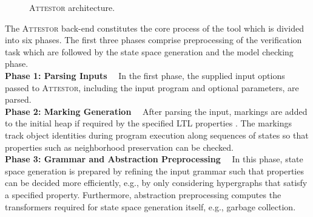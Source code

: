 \documentclass[a4paper, 12pt, twoside]{report}
\begin{document}
\begin{figure}
\begin{center}
{}
			\caption{\textsc{Attestor} architecture. \cite{arndt2018let}}\label{fig:attestor}
		\end{center}
	\end{figure}
	
	The \textsc{Attestor} back-end constitutes the core process of the tool which is divided into six phases. The first three phases comprise preprocessing of the verification task which are followed by the state space generation and the model checking phase.\\
	
	\textbf{Phase 1: Parsing Inputs$\quad$}
	In the first phase, the supplied input options passed to \textsc{Attestor}, including the input program and optional parameters, are parsed.\\
	
	\textbf{Phase 2: Marking Generation$\quad$} 
	After parsing the input, markings are added to the initial heap if required by the specified LTL properties \cite{heinen2015verifyingPhd}. The markings track object identities during program execution along sequences of states so that properties such as neighborhood preservation can be checked.\\
	
	\textbf{Phase 3: Grammar and Abstraction Preprocessing$\quad$}
	In this phase, state space generation is prepared by refining the input grammar such that properties can be decided more efficiently, e.g., by only considering hypergraphs that satisfy a specified property. Furthermore, abstraction preprocessing computes the transformers required for state space generation itself, e.g., garbage collection.\\ 
	
\end{document}
